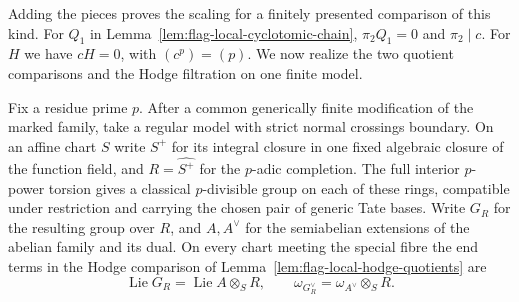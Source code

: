 Adding the pieces proves the scaling for a finitely presented comparison of this kind. For \(Q_1\) in Lemma~\ref{lem:flag-local-cyclotomic-chain}, \(\pi_2Q_1=0\) and \(\pi_2\mid c\). For \(H\) we have \(cH=0\), with \((c^p)=(p)\). We now realize the two quotient comparisons and the Hodge filtration on one finite model.

\begin{auxlemma}\label{lem:flag-completed-closure-group}
Fix a residue prime \(p\). After a common generically finite modification of the marked family, take a regular model with strict normal crossings boundary. On an affine chart \(S\) write \(S^+\) for its integral closure in one fixed algebraic closure of the function field, and \(R=\widehat{S^+}\) for the \(p\)-adic completion. The full interior \(p\)-power torsion gives a classical \(p\)-divisible group on each of these rings, compatible under restriction and carrying the chosen pair of generic Tate bases. Write \(G_R\) for the resulting group over \(R\), and \(A,A^\vee\) for the semiabelian extensions of the abelian family and its dual. On every chart meeting the special fibre the end terms in the Hodge comparison of Lemma~\ref{lem:flag-local-hodge-quotients} are
\[
 \operatorname{Lie}G_R=\operatorname{Lie}A\otimes_S R,\qquad
 \omega_{G_R^\vee}=\omega_{A^\vee}\otimes_S R .
\]
\end{auxlemma}

